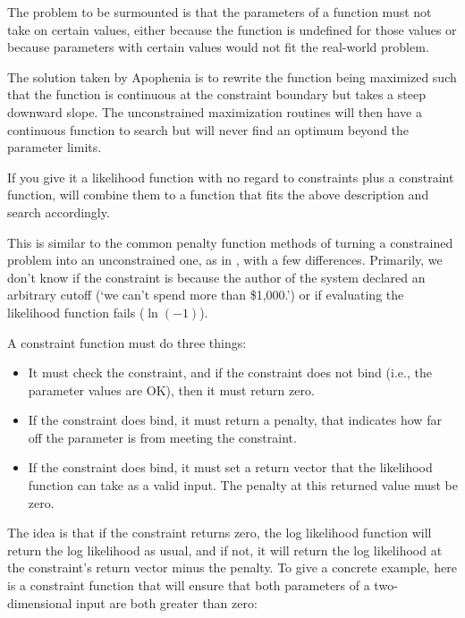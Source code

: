 The problem to be surmounted is that the parameters of a function must not take on
certain values, either because the function is undefined for those
values or because parameters with certain values would not fit the
real-world problem.

The solution taken by Apophenia is to rewrite the function being maximized such that the
function is continuous at the constraint boundary but takes a steep
downward slope. The unconstrained maximization routines will then have a 
continuous function to search but will never find an optimum 
beyond the parameter limits.

If you give it a likelihood function with no regard to constraints plus
a constraint function,  will combine
them to a function that fits the above description and search accordingly.

This is similar to the common penalty function methods of turning a
constrained problem into an unconstrained one, as in \citet{avriel:nonlinear},
with a few differences. Primarily, we don't know if the constraint is
because the author of the system declared an arbitrary cutoff (`we can't spend more
than \$1,000.') or if evaluating the likelihood function fails
($\ln(-1)$). 

A constraint function must do three things:
\begin{itemize}
\item It must check the constraint, and if the constraint does not bind (i.e., the parameter values are OK), then it must return zero.
\item If the constraint does bind, it must return a penalty, that indicates how far off the parameter is from meeting the constraint.
\item If the constraint does bind, it must set a return vector that the likelihood function can take as a valid input. The penalty at this returned value must be zero.
\end{itemize}

The idea is that if the constraint returns zero, the log likelihood
function will return the log likelihood as usual, and if not, it will
return the log likelihood at the constraint's return vector minus the
penalty. To give a concrete example, here is a constraint function that
will ensure that both parameters of a two-dimensional input are both
greater than zero:

